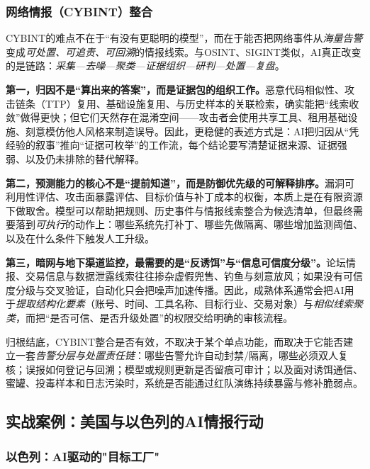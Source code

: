 
\subsubsection{网络情报（CYBINT）整合}

CYBINT的难点不在于“有没有更聪明的模型”，而在于能否把网络事件从\emph{海量告警}变成\emph{可处置、可追责、可回溯}的情报线索。与OSINT、SIGINT类似，AI真正改变的是链路：\emph{采集—去噪—聚类—证据组织—研判—处置—复盘}。

            {\bfseries 第一，归因不是“算出来的答案”，而是证据包的组织工作。}恶意代码相似性、攻击链条（TTP）复用、基础设施复用、与历史样本的关联检索，确实能把“线索收敛”做得更快；但它们天然存在混淆空间——攻击者会使用共享工具、租用基础设施、刻意模仿他人风格来制造误导。因此，更稳健的表述方式是：AI把归因从“凭经验的叙事”推向“证据可枚举”的工作流，每个结论要写清楚证据来源、证据强弱、以及仍未排除的替代解释。

            {\bfseries 第二，预测能力的核心不是“提前知道”，而是防御优先级的可解释排序。}漏洞可利用性评估、攻击面暴露评估、目标价值与补丁成本的权衡，本质上是在有限资源下做取舍。模型可以帮助把规则、历史事件与情报线索整合为候选清单，但最终需要落到\emph{可执行}的动作上：哪些系统先打补丁、哪些先做隔离、哪些增加监测阈值、以及在什么条件下触发人工升级。

            {\bfseries 第三，暗网与地下渠道监控，最需要的是“反诱饵”与“信息可信度分级”。}论坛情报、交易信息与数据泄露线索往往掺杂虚假兜售、钓鱼与刻意放风；如果没有可信度分级与交叉验证，自动化只会把噪声加速传播。因此，成熟体系通常会把AI用于\emph{提取结构化要素}（账号、时间、工具名称、目标行业、交易对象）与\emph{相似线索聚类}，而把“是否可信、是否升级处置”的权限交给明确的审核流程。

归根结底，CYBINT整合是否有效，不取决于某个单点功能，而取决于它能否建立一套\emph{告警分层与处置责任链}：哪些告警允许自动封禁/隔离，哪些必须双人复核；误报如何登记与回溯；模型或规则更新是否留痕可审计；以及面对诱饵通信、蜜罐、投毒样本和日志污染时，系统是否能通过红队演练持续暴露与修补脆弱点。

\subsection{实战案例：美国与以色列的AI情报行动}

\subsubsection{以色列：AI驱动的"目标工厂"}

